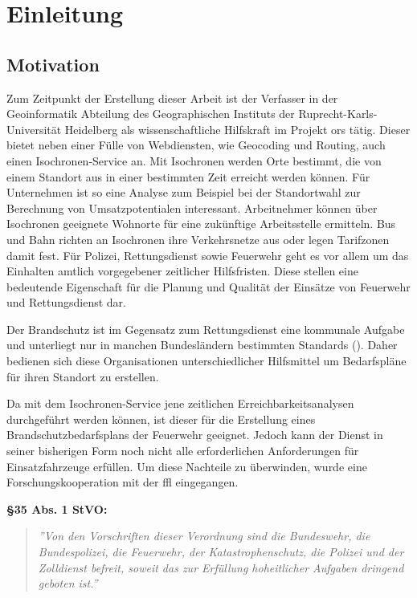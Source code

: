 \section{Einleitung}

\subsection{Motivation}
Zum Zeitpunkt der Erstellung dieser Arbeit ist der Verfasser in der Geoinformatik Abteilung des Geographischen Instituts der Ruprecht-Karls-Universität Heidelberg als wissenschaftliche Hilfskraft im Projekt \gls{ors} tätig.
Dieser bietet neben einer Fülle von Webdiensten, wie Geocoding und Routing, auch einen Isochronen-Service an.
Mit Isochronen werden Orte bestimmt, die von einem Standort aus in einer bestimmten Zeit erreicht werden können.
Für Unternehmen ist so eine Analyse zum Beispiel bei der Standortwahl zur Berechnung von Umsatzpotentialen interessant.
Arbeitnehmer können über Isochronen geeignete Wohnorte für eine zukünftige Arbeitsstelle ermitteln.
Bus und Bahn richten an Isochronen ihre Verkehrsnetze aus oder legen Tarifzonen damit fest.
Für Polizei, Rettungsdienst sowie Feuerwehr geht es vor allem um das Einhalten amtlich vorgegebener zeitlicher Hilfsfristen.
Diese stellen eine bedeutende Eigenschaft für die Planung und Qualität der Einsätze von Feuerwehr und Rettungsdienst dar.\par
Der Brandschutz ist im Gegensatz zum Rettungsdienst eine kommunale Aufgabe und unterliegt nur in manchen Bundesländern bestimmten Standards (\cite{bedarfsplan}).
Daher bedienen sich diese Organisationen unterschiedlicher Hilfsmittel um Bedarfspläne für ihren Standort zu erstellen.
\medskip

Da mit dem Isochronen-Service jene zeitlichen Erreichbarkeitsanalysen durchgeführt werden können, ist dieser für die Erstellung eines Brandschutzbedarfsplans der Feuerwehr geeignet.
Jedoch kann der Dienst in seiner bisherigen Form noch nicht alle erforderlichen Anforderungen für Einsatzfahrzeuge erfüllen.
Um diese Nachteile zu überwinden, wurde eine Forschungskooperation mit der \gls{ffl} eingegangen.
\vspace{1.2cm}

\textbf{§35 Abs. 1 StVO:}
\begin{quotation}
\label{cit:STVO}
{\itshape\rmfamily ''Von den Vorschriften dieser Verordnung sind die Bundeswehr, die Bundespolizei, die Feuerwehr, der Katastrophenschutz, die Polizei und der Zolldienst befreit, soweit das zur Erfüllung hoheitlicher Aufgaben dringend geboten ist.''}
\end{quotation}

